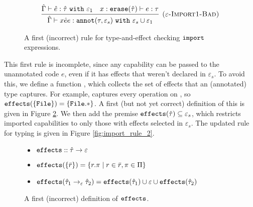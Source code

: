 \begin{figure}[h]
\vspace*{-5mm}
\[
\begin{array}{c}
\infer[\textsc{($\varepsilon$-Import1-Bad)}]
	{ \hat \Gamma \vdash {x}{\hat e}{e}: \kwa{annot}(\tau, \varepsilon_s)~\kw{with} \varepsilon_s \cup \varepsilon_1 }
	{ \hat \Gamma \vdash \hat e: \hat \tau~\kw{with} \varepsilon_1 & x: \kwa{erase}(\hat \tau) \vdash e: \tau }

\end{array}
\]
\vspace*{-5mm}
\caption{A first (incorrect) rule for type-and-effect checking $\mathtt{import}$ expressions.}
\vspace*{-5mm}
\label{fig:import_rule_1}
\end{figure}

This first rule is incomplete, since any capability can be passed to the unannotated
code $e$, even if it has effects that weren't declared in $\varepsilon_s$. To avoid
this, we define a function , which collects the
set of effects that an (annotated) type captures. For example, 
captures every operation on , so $\mathtt{effects}(\{\mathtt{File}\}) = \mathtt{\{File.*\}}$.
A first (but not yet correct) definition of this is given in Figure \ref{fig:fx_defn}.
We then add the premise $\mathtt{effects}(\hat \tau) \subseteq \varepsilon_s$,
which restricts imported capabilities to only those with effects selected in
$\varepsilon_s$. The updated rule for typing  is given in Figure
\ref{fig:import_rule_2}.

\begin{figure}
\vspace*{-4mm}
\begin{itemize}
	\setlength\itemsep{-0.2em}
\item[] $\mathtt{effects} :: \hat \tau \rightarrow \varepsilon$
	\item[] $\mathtt{effects}(\{ \bar r \}) = \{ r.\pi \mid r \in \bar r, \pi \in \Pi \}$
	\item[] $\mathtt{effects}(\hat \tau_1 \rightarrow_{\varepsilon} \hat \tau_2) = \mathtt{effects}(\hat \tau_1) \cup \varepsilon \cup \mathtt{effects}(\hat \tau_2)$
\end{itemize}
\vspace*{-5mm}
\caption{A first (incorrect) definition of $\mathtt{effects}$.}
\label{fig:fx_defn}
\end{figure}

